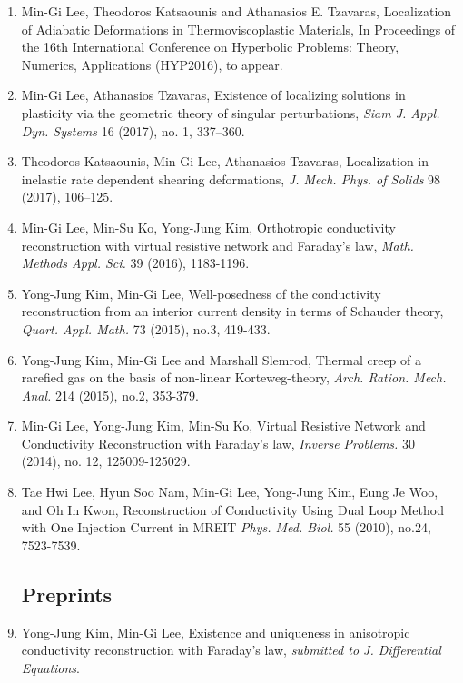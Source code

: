 \documentclass[a4paper,11pt]{article}
\begin{document}
\begin{enumerate}
\item Min-Gi Lee, Theodoros Katsaounis and Athanasios E. Tzavaras, Localization of Adiabatic Deformations in Thermoviscoplastic Materials, In Proceedings of the 16th International Conference on Hyperbolic Problems: Theory, Numerics, Applications (HYP2016), to appear. 
\item Min-Gi Lee, Athanasios Tzavaras, Existence of localizing solutions in plasticity via the geometric theory of singular perturbations, {\it Siam J. Appl. Dyn. Systems} 16 (2017), no. 1, 337--360.
\item Theodoros Katsaounis, Min-Gi Lee, Athanasios Tzavaras, Localization in inelastic rate dependent shearing deformations, {\it J. Mech. Phys. of Solids} 98 (2017), 106--125.
\item Min-Gi Lee, Min-Su Ko, Yong-Jung Kim, Orthotropic conductivity reconstruction with virtual resistive network and Faraday's law, {\it Math. Methods Appl. Sci.} 39 (2016), 1183-1196.%
\item Yong-Jung Kim, Min-Gi Lee, Well-posedness of the conductivity reconstruction from an interior current density in terms of Schauder theory, {\it Quart. Appl. Math.} 73 (2015), no.3, 419-433.
%
\item Yong-Jung Kim, Min-Gi Lee and Marshall Slemrod, Thermal creep of a rarefied gas on the basis of non-linear Korteweg-theory, {\it Arch. Ration. Mech. Anal.} 214 (2015), no.2, 353-379.
\item Min-Gi Lee, Yong-Jung Kim, Min-Su Ko, Virtual Resistive Network and Conductivity Reconstruction with Faraday's law, {\it Inverse Problems.} 30 (2014), no. 12, 125009-125029.
\item Tae Hwi Lee, Hyun Soo Nam, Min-Gi Lee, Yong-Jung Kim, Eung Je Woo, and Oh In Kwon, Reconstruction of Conductivity Using Dual Loop Method with One Injection Current in MREIT {\it Phys. Med. Biol.} 55 (2010), no.24, 7523-7539.
\subsection*{Preprints}
\item Yong-Jung Kim, Min-Gi Lee, Existence and uniqueness in anisotropic conductivity reconstruction with Faraday's law, {\it submitted to J. Differential Equations}.


\end{enumerate}
\end{document}
